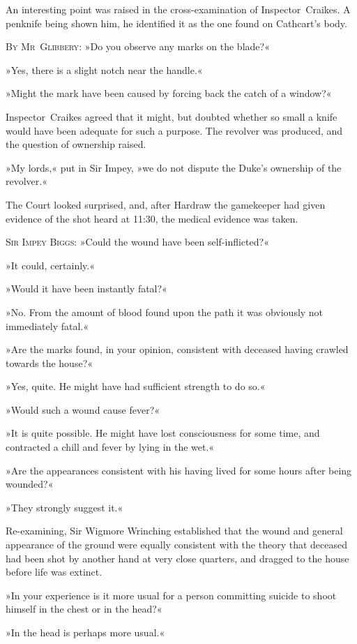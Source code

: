 An interesting point was raised in the cross-examination of Inspector~Craikes. A penknife being shown him, he identified it as the one found on Cathcart's body.

\textsc{By Mr~Glibbery}: »Do you observe any marks on the blade?«

»Yes, there is a slight notch near the handle.«

»Might the mark have been caused by forcing back the catch of a window?«

Inspector~Craikes agreed that it might, but doubted whether so small a knife would have been adequate for such a purpose. The revolver was produced, and the question of ownership raised.

»My lords,« put in Sir Impey, »we do not dispute the Duke's ownership of the revolver.«

The Court looked surprised, and, after Hardraw the gamekeeper had given evidence of the shot heard at 11:30, the medical evidence was taken.

\textsc{Sir Impey Biggs}: »Could the wound have been self-inflicted?«

»It could, certainly.«

»Would it have been instantly fatal?«

»No. From the amount of blood found upon the path it was obviously not immediately fatal.«

»Are the marks found, in your opinion, consistent with deceased having crawled towards the house?«

»Yes, quite. He might have had sufficient strength to do so.«

»Would such a wound cause fever?«

»It is quite possible. He might have lost consciousness for some time, and contracted a chill and fever by lying in the wet.«

»Are the appearances consistent with his having lived for some hours after being wounded?«

»They strongly suggest it.«

Re-examining, Sir Wigmore Wrinching established that the wound and general appearance of the ground were equally consistent with the theory that deceased had been shot by another hand at very close quarters, and dragged to the house before life was extinct.

»In your experience is it more usual for a person committing suicide to shoot himself in the chest or in the head?«

»In the head is perhaps more usual.«

